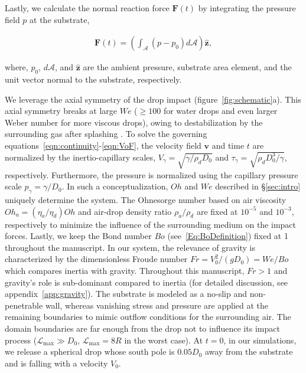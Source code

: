 \documentclass{jfm}
\begin{document}
	
	\noindent Lastly, we calculate the normal reaction force $\boldsymbol{F}(t)$ by integrating the pressure field $p$ at the substrate,
	
	\begin{align}\label{Eqn:ReactionForce}
		\boldsymbol{F}(t) = \left(\int_\mathcal{A} \left(p-p_0\right)d\mathcal{A}\right)\hat{\boldsymbol{z}},
	\end{align}
	
	\noindent where, $p_0$, $d\mathcal{A}$, and $\hat{\boldsymbol{z}}$ are the ambient pressure, substrate area element, and the unit vector normal to the substrate, respectively. 
	
	We leverage the axial symmetry of the drop impact (figure~\ref{fig:schematic}a). This axial symmetry breaks at large $We$ ($\ge 100$ for water drops and even larger Weber number for more viscous drops), owing to destabilization by the surrounding gas after splashing \citep{xu2005drop, Eggers2010, Driscoll2011, riboux2014experiments, Josserand2016, zhang2022impact}. 
	To solve the governing equations~\eqref{eqn:continuity}-\eqref{eqn:VoF}, the velocity field $\boldsymbol{v}$ and time $t$ are normalized by the inertio-capillary scales, $V_\gamma = \sqrt{\gamma/\rho_dD_0}$ and $\tau_\gamma = \sqrt{\rho_dD_0^3/\gamma}$, respectively. Furthermore, the pressure is normalized using the capillary pressure scale $p_\gamma = \gamma/D_0$. In such a conceptualization, $Oh$ and $We$ described in \S\ref{sec:intro} uniquely determine the system. 
	The Ohnesorge number based on air viscosity $Oh_a = \left(\eta_a/\eta_d\right)Oh$ and air-drop density ratio $\rho_a/\rho_d$ are fixed at $10^{-5}$ and $10^{-3}$, respectively to minimize the influence of the surrounding medium on the impact forces. 
	Lastly, we keep the Bond number $Bo$ (see~\eqref{Eq:BoDefinition}) fixed at 1 throughout the manuscript. In our system, the relevance of gravity is characterized by the dimensionless Froude number $Fr = V_0^2/(gD_0) = We/Bo$ which compares inertia with gravity. Throughout this manuscript, $Fr > 1$ and gravity's role is sub-dominant compared to inertia (for detailed discussion, see appendix~\ref{app:gravity}).
	The substrate is modeled as a no-slip and non-penetrable wall, whereas vanishing stress and pressure are applied at the remaining boundaries to mimic outflow conditions for the surrounding air. The domain boundaries are far enough from the drop not to influence its impact process ($\mathcal{L}_\text{max} \gg D_0$, $\mathcal{L}_\text{max} = 8R$ in the worst case). 
	At $t = 0$, in our simulations, we release a spherical drop whose south pole is $0.05D_0$ away from the substrate and is falling with a velocity $V_0$. 
\end{document}
